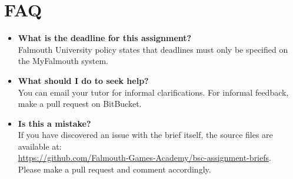 \documentclass{../../fal_assignment}
\begin{document}



\section*{FAQ}

\begin{itemize}
	\item 	\textbf{What is the deadline for this assignment?} \\ 
    		Falmouth University policy states that deadlines must only be specified on the MyFalmouth system.
    		
	\item 	\textbf{What should I do to seek help?} \\ 
    		You can email your tutor for informal clarifications. For informal feedback, make a pull request on BitBucket. 
    		
    	\item 	\textbf{Is this a mistake?} \\ 	
    		If you have discovered an issue with the brief itself, the source files are available at: \\
    		\url{https://github.com/Falmouth-Games-Academy/bsc-assignment-briefs}.\\
    		 Please make a pull request and comment accordingly.
\end{itemize}
\end{document}
